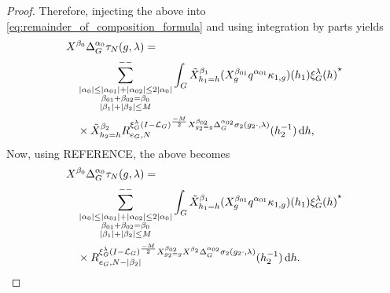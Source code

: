 \begin{proof}
    Therefore,
    injecting the above into \eqref{eq:remainder_of_composition_formula} and using integration by parts yields
    \begin{align*}
        &\LeftDifferentialOperator {\beta_0} \DifferenceOperatorOrder {\alpha_0} \tau_N(g, \lambda) =\\
        &\quad \lcsum{%
            \substack{%
                \abs{\alpha_0} \leq \abs{\alpha_{01}} + \abs{\alpha_{02}} \leq 2 \abs{\alpha_0}\\
                \beta_{01} + \beta_{02} = \beta_0\\
                \abs {\beta_1} + \abs {\beta_2} \leq M
            }
        }
        \int_\Group \RightDifferentialOperator[h_1 = h] {\beta_1} (\LeftDifferentialOperator [g] {\beta_{01}} q^{\alpha_{01}} \kappa_{1, g})(h_1) \adj {\Rep \lambda(h)}\\
        &\quad \times
        \RightDifferentialOperator[h_2 = h] {\beta_2} \TaylorRemainder {\Rep \lambda \BesselPotential {-M} \LeftDifferentialOperator [g_2 = g] {\beta_{02}} \DifferenceOperatorOrder {\alpha_{02}} \sigma_2(g_2 \dummy, \lambda)} {e_\Group} N (h_2^{-1}) \dd h,
    \end{align*}
    Now, using REFERENCE, %
    the above becomes
    \begin{align*}
        &\LeftDifferentialOperator {\beta_0} \DifferenceOperatorOrder {\alpha_0} \tau_N(g, \lambda) =\\
        &\quad \lcsum{%
            \substack{%
                \abs{\alpha_0} \leq \abs{\alpha_{01}} + \abs{\alpha_{02}} \leq 2 \abs{\alpha_0}\\
                \beta_{01} + \beta_{02} = \beta_0\\
                \abs {\beta_1} + \abs {\beta_2} \leq M
            }
        }
        \int_\Group \RightDifferentialOperator[h_1 = h] {\beta_1} (\LeftDifferentialOperator [g] {\beta_{01}} q^{\alpha_{01}} \kappa_{1, g})(h_1) \adj {\Rep \lambda(h)}\\
        &\quad \times
        \TaylorRemainder {\Rep \lambda \BesselPotential {-M} \LeftDifferentialOperator [g_2 = g] {\beta_{02}} \LeftDifferentialOperator {\beta_2} \DifferenceOperatorOrder {\alpha_{02}} \sigma_2(g_2 \dummy, \lambda)} {e_\Group} {N - \abs {\beta_2}} (h_2^{-1}) \dd h.
    \end{align*}


\end{proof}
